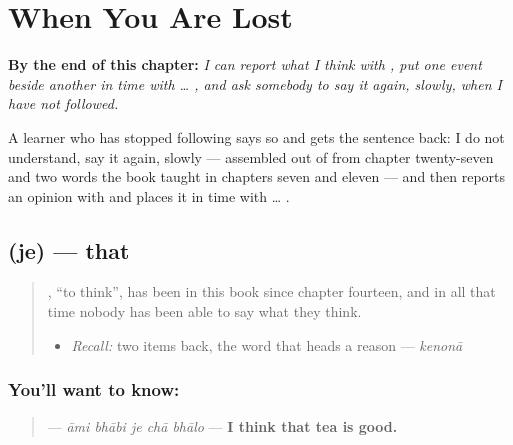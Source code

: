 
\chapter{When You Are Lost}
\label{ch:bn-when-you-are-lost}

\begin{chapteropening}
\textbf{By the end of this chapter:} \emph{I can report what I think with , put one event beside another in time with  … , and ask somebody to say it again, slowly, when I have not followed.}

A learner who has stopped following says so and gets the sentence back: I do not understand, say it again, slowly — assembled out of  from chapter twenty-seven and two words the book taught in chapters seven and eleven — and then reports an opinion with  and places it in time with  … .
\end{chapteropening}

\section[\texorpdfstring{\bn{যে} (je)}{যে (je)}]{ (je) — that}

\label{lesson:BN-C19-je}



\begin{quote}
\textbf{}, \textquotedblleft{}to think\textquotedblright{}, has been in this book since chapter fourteen, and in all that time nobody has been able to say what they think.

\begin{itemize}
\raggedright
  \item \emph{Recall:} two items back, the word that heads a reason — \emph{kenonā}
\end{itemize}
\end{quote}

\subsection*{You'll want to know: }
\begin{quote}
\textbf{    } — \emph{āmi bhābi je chā bhālo} — \textbf{I think that tea is good.}
\end{quote}

